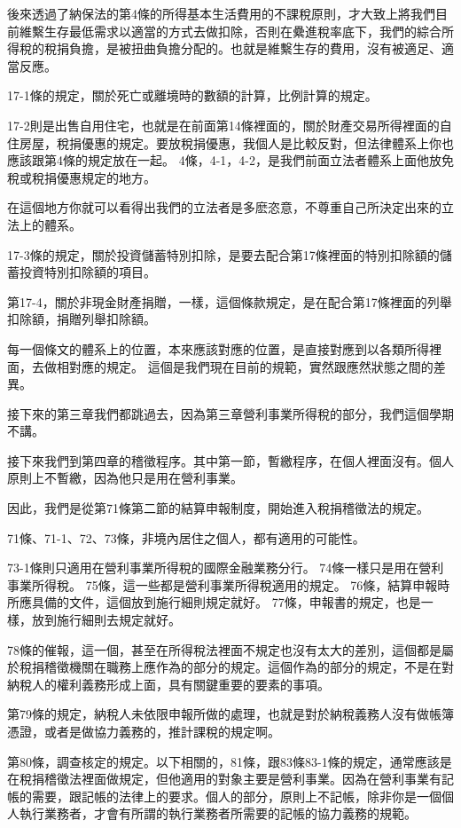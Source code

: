 \documentclass[]{ctexbook}
\begin{document}
後來透過了納保法的第4條的所得基本生活費用的不課稅原則，才大致上將我們目前維繫生存最低需求以適當的方式去做扣除，否則在纍進稅率底下，我們的綜合所得稅的稅捐負擔，是被扭曲負擔分配的。也就是維繫生存的費用，沒有被適足、適當反應。

17-1條的規定，關於死亡或離境時的數額的計算，比例計算的規定。

17-2則是出售自用住宅，也就是在前面第14條裡面的，關於財產交易所得裡面的自住房屋，稅捐優惠的規定。要放稅捐優惠，我個人是比較反對，但法律體系上你也應該跟第4條的規定放在一起。
4條，4-1，4-2，是我們前面立法者體系上面他放免稅或稅捐優惠規定的地方。

在這個地方你就可以看得出我們的立法者是多麽恣意，不尊重自己所決定出來的立法上的體系。

17-3條的規定，關於投資儲蓄特別扣除，是要去配合第17條裡面的特別扣除額的儲蓄投資特別扣除額的項目。

第17-4，關於非現金財產捐贈，一樣，這個條款規定，是在配合第17條裡面的列舉扣除額，捐贈列舉扣除額。

每一個條文的體系上的位置，本來應該對應的位置，是直接對應到以各類所得裡面，去做相對應的規定。
這個是我們現在目前的規範，實然跟應然狀態之間的差異。

接下來的第三章我們都跳過去，因為第三章營利事業所得稅的部分，我們這個學期不講。

接下來我們到第四章的稽徵程序。其中第一節，暫繳程序，在個人裡面沒有。個人原則上不暫繳，因為他只是用在營利事業。

因此，我們是從第71條第二節的結算申報制度，開始進入稅捐稽徵法的規定。

71條、71-1、72、73條，非境內居住之個人，都有適用的可能性。

73-1條則只適用在營利事業所得稅的國際金融業務分行。
74條一樣只是用在營利事業所得稅。
75條，這一些都是營利事業所得稅適用的規定。
76條，結算申報時所應具備的文件，這個放到施行細則規定就好。
77條，申報書的規定，也是一樣，放到施行細則去規定就好。

78條的催報，這一個，甚至在所得稅法裡面不規定也沒有太大的差別，這個都是屬於稅捐稽徵機關在職務上應作為的部分的規定。這個作為的部分的規定，不是在對納稅人的權利義務形成上面，具有關鍵重要的要素的事項。

第79條的規定，納稅人未依限申報所做的處理，也就是對於納稅義務人沒有做帳簿憑證，或者是做協力義務的，推計課稅的規定啊。

第80條，調查核定的規定。以下相關的，81條，跟83條83-1條的規定，通常應該是在稅捐稽徵法裡面做規定，但他適用的對象主要是營利事業。因為在營利事業有記帳的需要，跟記帳的法律上的要求。個人的部分，原則上不記帳，除非你是一個個人執行業務者，才會有所謂的執行業務者所需要的記帳的協力義務的規範。
\end{document}
